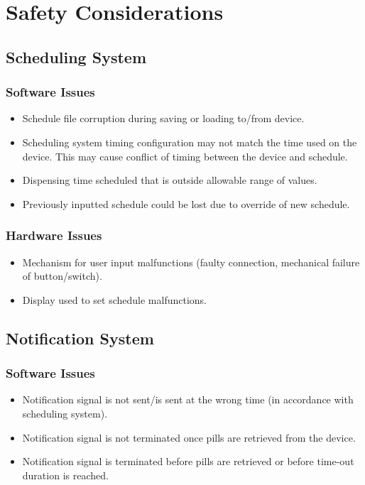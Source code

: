 \documentclass[12pt,titlepage]{article}
\begin{document}
\section{Safety Considerations}
\subsection{Scheduling System}
\subsubsection*{Software Issues}
\begin{itemize}
\item Schedule file corruption during saving or loading to/from device.
\item Scheduling system timing configuration may not match the time used on the device. This may cause conflict of timing between the device and schedule.
\item Dispensing time scheduled that is outside allowable range of values.
\item Previously inputted schedule could be lost due to override of new schedule.
\end{itemize}
\subsubsection*{Hardware Issues}
\begin{itemize}
\item Mechanism for user input malfunctions (faulty connection, mechanical failure of button/switch).
\item Display used to set schedule malfunctions.
\end{itemize}

\subsection{Notification System}
\subsubsection*{Software Issues}
\begin{itemize}
\item Notification signal is not sent/is sent at the wrong time (in accordance with scheduling system).
\item Notification signal is not terminated once pills are retrieved from the device.
\item Notification signal is terminated before pills are retrieved or before time-out duration is reached.
\end{itemize}
\end{document}
